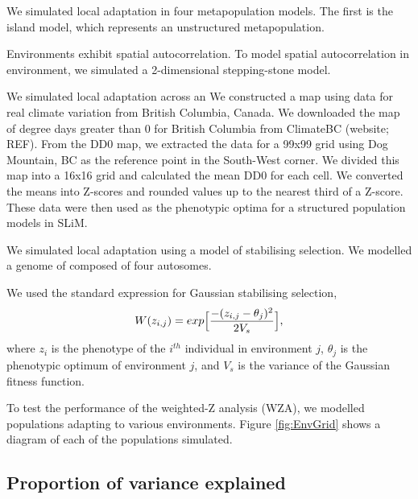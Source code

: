 \documentclass[11pt,twoside,lineno]{GSA_format}
\begin{document}
We simulated local adaptation in four metapopulation models. The first is the island model, which represents an unstructured metapopulation. 

Environments exhibit spatial autocorrelation. To model spatial autocorrelation in environment, we simulated a 2-dimensional stepping-stone model. 

We simulated local adaptation across an 
We constructed a map using data for real climate variation from British Columbia, Canada. We downloaded the map of degree days greater than 0 for British Columbia from ClimateBC (website; REF). From the DD0 map, we extracted the data for a 99x99 grid using Dog Mountain, BC as the reference point in the South-West corner. We divided this map into a 16x16 grid and calculated the mean DD0 for each cell. We converted the means into Z-scores and rounded values up to the nearest third of a Z-score. These data were then used as the phenotypic optima for a structured population models in SLiM.

We simulated local adaptation using a model of stabilising selection. We modelled a genome of composed of four autosomes. 

We used the standard expression for Gaussian stabilising selection,
\begin{equation}
\notag
W(z_{i,j}) = exp \Big[\frac{-(z_{i,j} - \theta_j)^2}{2V_s}\Big],
\end{equation}
where $z_i$ is the phenotype of the $i^{th}$ individual in environment $j$, $\theta_j$ is the phenotypic optimum of environment $j$, and $V_s$ is the variance of the Gaussian fitness function. 

To test the performance of the weighted-Z analysis (WZA), we modelled populations adapting to various environments. Figure \ref{fig:EnvGrid} shows a diagram of each of the populations simulated.


\subsection{Proportion of variance explained} 
\end{document}
